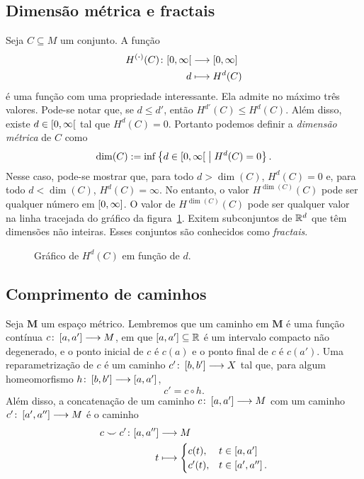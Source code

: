 \subsection{Dimensão métrica e fractais}

Seja $C \subseteq M$ um conjunto. A função
	\begin{align*}
	{H^{(\bm{\cdot})}(C)}\colon {\left[0,\allowbreak \infty\right[} &\longrightarrow {\left[0,\allowbreak \infty\right]} \\{d} &\longmapsto H^d(C)
	\end{align*}
é uma função com uma propriedade interessante. Ela admite no máximo três valores. Pode-se notar que, se $d \leq d'$, então $H^{d'}(C) \leq H^d(C)$. Além disso, existe $d \in \left[0,\allowbreak \infty\right[$ tal que $H^d(C) = 0$. Portanto podemos definir a \emph{dimensão métrica} de $C$ como
	\begin{equation*}
	\dim(C) := \inf\left\{ d \in \left[0,\allowbreak \infty\right[ \;\middle\vert\; H^d(C)=0 \right\}.
	\end{equation*}
Nesse caso, pode-se mostrar que, para todo $d>\dim(C)$, $H^d(C) = 0$ e, para todo $d < \dim(C)$, $H^d(C) = \infty$. No entanto, o valor $H^{\dim(C)}(C)$ pode ser qualquer número em $\left[0,\allowbreak \infty\right]$. O valor de $H^{\dim(C)}(C)$ pode ser qualquer valor na linha tracejada do gráfico da figura~\ref{fig:dimensaometrica}. Exitem subconjuntos de $\mathbb{R}^d$ que têm dimensões não inteiras. Esses conjuntos são conhecidos como \emph{fractais}.

\begin{figure}
\centering
{}
\caption{Gráfico de $H^d(C)$ em função de $d$.}
\label{fig:dimensaometrica}
\end{figure}




\subsection{Comprimento de caminhos}

Seja $\bm M$ um espaço métrico. Lembremos que um caminho em $\bm M$ é uma função contínua $c\colon \allowbreak \left[a,\allowbreak a'\right] \longrightarrow M$, em que $\left[a,\allowbreak a'\right] \subseteq \mathbb{R}$ é um intervalo compacto não degenerado, e o ponto inicial de $c$ é $c(a)$ e o ponto final de $c$ é $c(a')$. Uma reparametrização de $c$ é um caminho $c'\colon \allowbreak \left[b,\allowbreak b'\right] \longrightarrow X$ tal que, para algum homeomorfismo $h\colon \allowbreak \left[b,\allowbreak b'\right] \longrightarrow \left[a,\allowbreak a'\right]$,
	\begin{equation*}
	c' = c \circ h.
	\end{equation*}
Além disso, a concatenação de um caminho $c\colon \allowbreak \left[a,\allowbreak a'\right] \longrightarrow M$ com um caminho $c'\colon \allowbreak \left[a',\allowbreak a''\right] \longrightarrow M$ é o caminho
	\begin{align*}
	\func{c \conca c'}{\intff{a}{a''}}{M}{t}{
		\begin{cases}
		c(t),	& t \in \intff{a}{a'} \\
		c'(t),	& t \in \intff{a'}{a''}.
		\end{cases}
	}
	\end{align*}

